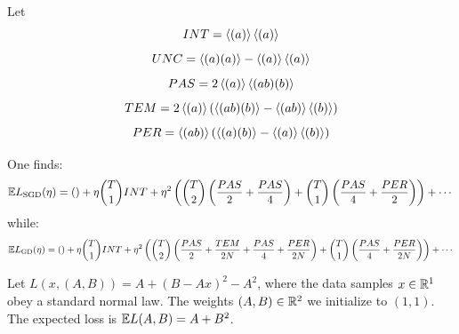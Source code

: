 \documentclass[12pt]{article}
\begin{document}

        Let
        $$
            INT = \left\langle (a) \right\rangle\left\langle (a) \right\rangle
        $$$$
            UNC = \left\langle (a)(a) \right\rangle-\left\langle (a) \right\rangle\left\langle (a) \right\rangle
        $$$$
            PAS = 2\left\langle (a) \right\rangle\left\langle (ab)(b) \right\rangle
        $$$$
            TEM = 2\left\langle (a) \right\rangle(\left\langle (ab)(b) \right\rangle-\left\langle (ab) \right\rangle\left\langle (b) \right\rangle)
        $$$$
            PER = \left\langle (ab) \right\rangle(\left\langle (a)(b) \right\rangle-\left\langle (a) \right\rangle\left\langle (b) \right\rangle)
        $$

        One finds:
        $$
            \mathbb{E} L_{\text{SGD}}(\eta) =
                () + \eta {T \choose 1} INT +
                \eta^2 \left( 
                    {T \choose 2} \left( \frac{PAS}{2} + \frac{PAS}{4} \right) + 
                    {T \choose 1} \left( \frac{PAS}{4} + \frac{PER}{2} \right)
                 \right) + \cdots
        $$
        while:
        $$
            \mathbb{E} L_{\text{GD}}(\eta) =
                () + \eta {T \choose 1} INT  +
                \eta^2 \left( 
                    {T \choose 2} \left( \frac{PAS}{2} + \frac{TEM}{2N} + \frac{PAS}{4} + \frac{PER}{2N} \right) + 
                    {T \choose 1} \left( \frac{PAS}{4} + \frac{PER}{2N} \right)
                 \right) + \cdots
        $$

            Let $L(x, (A, B)) = A + (B - Ax)^2 - A^2$, where the data samples $x\in \mathbb{R}^1$ obey a standard normal law.   
            The weights $(A, B)\in \mathbb{R}^2$ we initialize to $(1, 1)$.
            The expected loss is $\mathbb{E} L(A, B) = A + B^2$. 
\end{document}
